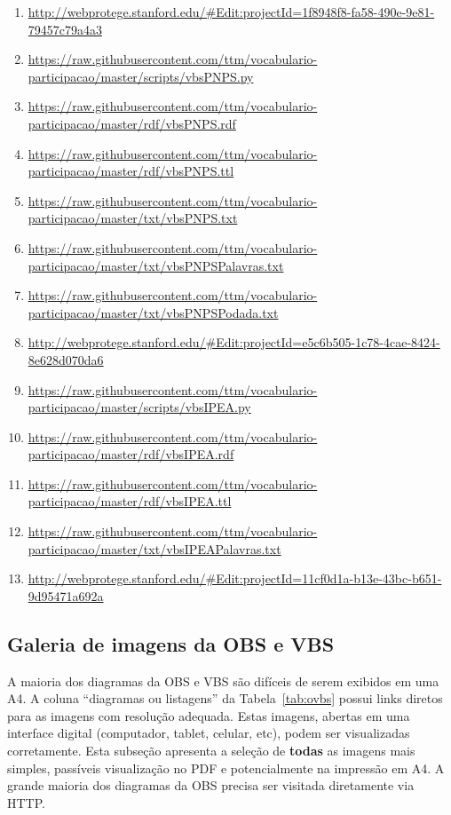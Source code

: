 \documentclass[12pt]{article}
\begin{document}
{\begin{enumerate}
    \item  \url{http://webprotege.stanford.edu/#Edit:projectId=1f8948f8-fa58-490e-9e81-79457c79a4a3}\label{i:76wp}

\item \url{https://raw.githubusercontent.com/ttm/vocabulario-participacao/master/scripts/vbsPNPS.py}         \label{i:77}
    \item \url{https://raw.githubusercontent.com/ttm/vocabulario-participacao/master/rdf/vbsPNPS.rdf}        \label{i:78}
    \item \url{https://raw.githubusercontent.com/ttm/vocabulario-participacao/master/rdf/vbsPNPS.ttl}        \label{i:79}
    \item \url{https://raw.githubusercontent.com/ttm/vocabulario-participacao/master/txt/vbsPNPS.txt}        \label{i:80}
    \item \url{https://raw.githubusercontent.com/ttm/vocabulario-participacao/master/txt/vbsPNPSPalavras.txt}\label{i:81}
    \item \url{https://raw.githubusercontent.com/ttm/vocabulario-participacao/master/txt/vbsPNPSPodada.txt}  \label{i:82}
    \item \url{http://webprotege.stanford.edu/#Edit:projectId=e5c6b505-1c78-4cae-8424-8e628d070da6}  \label{i:82wp}

\item \url{https://raw.githubusercontent.com/ttm/vocabulario-participacao/master/scripts/vbsIPEA.py}         \label{i:83}
    \item \url{https://raw.githubusercontent.com/ttm/vocabulario-participacao/master/rdf/vbsIPEA.rdf}        \label{i:84}
    \item \url{https://raw.githubusercontent.com/ttm/vocabulario-participacao/master/rdf/vbsIPEA.ttl}        \label{i:85}
    \item \url{https://raw.githubusercontent.com/ttm/vocabulario-participacao/master/txt/vbsIPEAPalavras.txt}\label{i:86}
    \item \url{http://webprotege.stanford.edu/#Edit:projectId=11cf0d1a-b13e-43bc-b651-9d95471a692a}\label{i:86wp}
\end{enumerate}
}
\newpage
\subsection{Galeria de imagens da OBS e VBS}
A maioria dos diagramas da OBS e VBS são difíceis de serem exibidos em uma A4. A coluna ``diagramas ou listagens'' da Tabela~\ref{tab:ovbs} possui links diretos para as imagens com resolução adequada. Estas imagens, abertas em uma interface digital (computador, tablet, celular, etc), podem ser visualizadas corretamente.
Esta subseção apresenta a seleção de {\bf todas} as imagens mais simples, passíveis visualização no PDF e potencialmente na impressão em A4. A grande maioria dos diagramas da OBS precisa ser visitada diretamente via HTTP.
\end{document}
